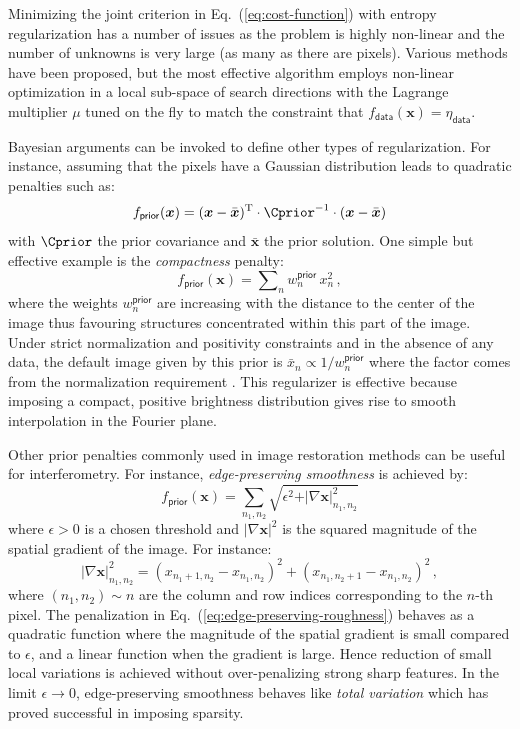 \documentclass{article}
\newcommand{\Tag}[1]{\mathsf{#1}}        %
\newcommand{\V}[1]{\boldsymbol{#1}}      %
\newcommand{\T}{^\mathrm{T}}             %
\newcommand{\QuadTerm}[2]{ #2\T\cdot #1\cdot #2}
\newcommand{\abs}[1]{\vert #1\vert}
\newcommand{\Eq}[1]{Eq.~(\ref{#1})}
\newcommand{\Param}{x}
\newcommand{\VParam}{\V{\Param}}
\newcommand{\DataTag}{\Tag{data}}
\newcommand{\PriorTag}{\Tag{prior}}
\newcommand{\DataLevel}{\eta_\DataTag}
\newcommand{\Fcost}{f}
\newcommand{\Fdata}{\Fcost_\DataTag}
\newcommand{\Fprior}{\Fcost_\PriorTag}
\begin{document}
Minimizing the joint criterion in \Eq{eq:cost-function} with entropy
regularization has a number of issues as the problem is highly non-linear and
the number of unknowns is very large (as many as there are pixels).
Various methods have been proposed, but the most effective algorithm
\citep{Skilling_Bryan-1984-maximum_entropy} employs non-linear optimization in
a local sub-space of search directions with the Lagrange multiplier $\mu$
tuned on the fly to match the constraint that $\Fdata(\VParam)=\DataLevel$.

Bayesian arguments can be invoked to define other types of regularization.
For instance, assuming that the pixels have a Gaussian distribution leads to
quadratic penalties such as:
\begin{equation}
  \label{eq:gauss-prior}
  \Fprior(\VParam) = \QuadTerm{\Cprior^{-1}}{(\VParam - \bar{\VParam})}
\end{equation}
with $\Cprior$ the prior covariance and $\bar{\VParam}$ the prior solution.
One simple but effective example is the \emph{compactness} penalty:
\begin{equation}
  \label{eq:fov-penalty}
  \Fprior(\VParam) = \sum\nolimits_{n} w^\PriorTag_n\,\Param_n^2 \, ,  
\end{equation}
where the weights $w^\PriorTag_n$ are increasing with the distance to the
center of the image thus favouring structures concentrated within this part of
the image.  Under strict normalization and positivity constraints and in the
absence of any data, the default image given by this prior is
$\bar{x}_n\propto1/w^\PriorTag_n$ where the factor comes from the
normalization requirement \citep{LeBesnerais_et_al-2008-interferometry}. This
regularizer is effective because imposing a compact, positive brightness
distribution gives rise to smooth interpolation in the Fourier plane.

Other prior penalties commonly used in image restoration methods can be useful
for interferometry.  For instance, \emph{edge-preserving smoothness} is
achieved by:
\begin{equation}
  \label{eq:edge-preserving-roughness}
  \Fprior(\VParam) = \sum_{n_1,n_2}
  \sqrt{\epsilon^2 + \abs{\nabla\VParam}_{n_1,n_2}^2}
\end{equation}
where $\epsilon>0$ is a chosen threshold and $\abs{\nabla\VParam}^2$ is the
squared magnitude of the spatial gradient of the image.  For instance:
\begin{displaymath}
  \label{eq:spatial-gradient-magnitude}
  \abs{\nabla\VParam}_{n_1,n_2}^2 =
  (x_{n_1+1,n_2} - x_{n_1,n_2})^2 + (x_{n_1,n_2+1} - x_{n_1,n_2})^2 \, ,
\end{displaymath}
where $(n_1,n_2) \sim n$ are the column and row indices corresponding to the
$n$-th pixel.  The penalization in \Eq{eq:edge-preserving-roughness} behaves as
a quadratic function where the magnitude of the spatial gradient is small
compared to $\epsilon$, and a linear function when the gradient is large. 
Hence reduction of small local variations is achieved without over-penalizing
strong sharp features.  In the limit $\epsilon\rightarrow0$, edge-preserving
smoothness behaves like \emph{total variation}
\citep{Rudin_et_al-1992-total_variation} which has proved successful in
imposing sparsity.
\end{document}
